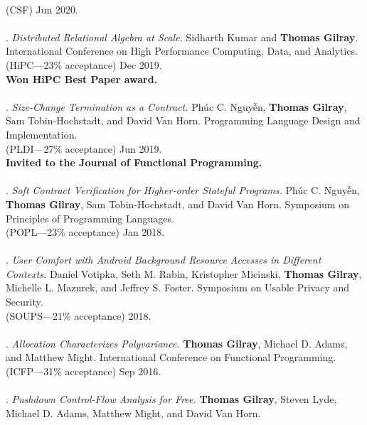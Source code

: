 \\(CSF) Jun 2020. 
\\ \vspace{-0.1cm}\\
\paper. \textit{Distributed Relational Algebra at Scale.}
Sidharth Kumar and \textbf{Thomas Gilray}.
International Conference on High Performance Computing, Data, and Analytics.
\\(HiPC---23\% acceptance) Dec 2019. 
\\\textbf{Won HiPC Best Paper award.} \\ \vspace{-0.1cm}\\
\paper. \textit{Size-Change Termination as a Contract.}
Phúc C. Nguyễn, \textbf{Thomas Gilray}, Sam Tobin-Hochstadt, and David Van Horn.
Programming Language Design and Implementation.
\\(PLDI---27\% acceptance) Jun 2019. 
\\\textbf{Invited to the Journal of Functional Programming.} \\ \vspace{-0.1cm}\\
\paper. \textit{Soft Contract Verification for Higher-order Stateful Programs.}
Phúc C. Nguyễn, \textbf{Thomas Gilray}, Sam Tobin-Hochstadt, and David Van Horn.
Symposium on Principles of Programming Languages.
\\(POPL---23\% acceptance) Jan 2018. 
\\ \vspace{-0.1cm}\\
\paper. \textit{User Comfort with Android Background Resource Accesses in Different Contexts.}
Daniel Votipka, Seth M. Rabin, Kristopher Micinski, \textbf{Thomas Gilray}, Michelle L. Mazurek, and Jeffrey S. Foster.
Symposium on Usable Privacy and Security.
\\(SOUPS---21\% acceptance) 2018. 
\\ \vspace{-0.1cm}\\
\paper. \textit{Allocation Characterizes Polyvariance.}
\textbf{Thomas Gilray}, Michael D. Adams, and Matthew Might.
International Conference on Functional Programming.
\\(ICFP---31\% acceptance) Sep 2016. 
\\ \vspace{-0.1cm}\\
\paper. \textit{Pushdown Control-Flow Analysis for Free.}
\textbf{Thomas Gilray}, Steven Lyde, Michael D. Adams, Matthew Might, and David Van Horn.
